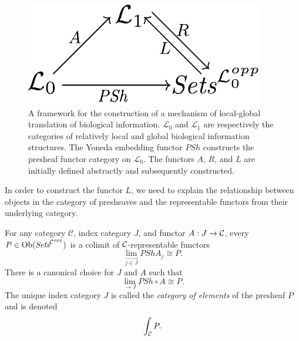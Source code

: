 \begin{frame}
\begin{figure}
\noindent\includegraphics[width=0.5\columnwidth]{fig/ascent.pdf}
\caption{A framework for the construction of a mechanism of local-global translation of biological information. $\mathcal{L}_0$ and $\mathcal{L}_1$ are respectively the categories of relatively local and global biological information structures. The Yoneda embedding functor $PSh$ constructs the presheaf functor category on $\mathcal{L}_0$. The functors $A$, $R$, and $L$ are initially defined abstractly and subsequently constructed.}
\label{fig:ascent}
\end{figure}
\end{frame}

\begin{frame}
In order to construct the functor $L$, we need to explain the relationship between objects in the category of presheaves and the representable functors from their underlying category.
\end{frame}

\begin{frame}
\iftoggle{thmsty}{
\begin{definition}
\label{definition-category-of-elements}
}{}
For any category $\mathcal{C}$, index category $J$, and functor $A:J \rightarrow {\mathcal C}$, every $P \in \mathop{\rm Ob}\nolimits(\textit{Sets}^{{\mathcal C}^{opp}})$ is a colimit of ${\mathcal C}$-representable functors
$$
\lim\limits_{\overrightarrow{j \in J}} PSh A_j \cong P.
$$
There is a canonical choice for $J$ and $A$ such that
$$
\lim\limits_{\rightarrow{J}} PSh \circ A \cong P.
$$
The unique index category $J$ is called the {\it category of elements} of the presheaf $P$ and is denoted
$$
\int_{{\mathcal C}} P.
$$
\end{frame}


